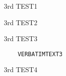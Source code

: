 \begin{problem}
  3rd TEST1
\end{problem}
\begin{problem}
  3rd TEST2
\end{problem}
\begin{problem}
  3rd TEST3
  \begin{verbatim}
    VERBATIMTEXT3
  \end{verbatim}
\end{problem}
\begin{problem}
  3rd TEST4
\end{problem}
